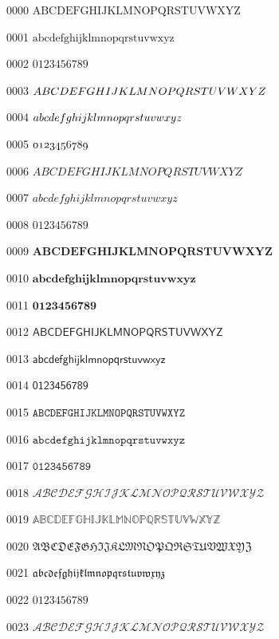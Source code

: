 \documentclass{article}
\begin{document}
0000 $\mathrm{ABCDEFGHIJKLMNOPQRSTUVWXYZ}$\par
0001 $\mathrm{abcdefghijklmnopqrstuvwxyz}$\par
0002 $\mathrm{0123456789}$\par
0003 $\mathnormal{ABCDEFGHIJKLMNOPQRSTUVWXYZ}$\par
0004 $\mathnormal{abcdefghijklmnopqrstuvwxyz}$\par
0005 $\mathnormal{0123456789}$\par
0006 $\mathit{ABCDEFGHIJKLMNOPQRSTUVWXYZ}$\par
0007 $\mathit{abcdefghijklmnopqrstuvwxyz}$\par
0008 $\mathit{0123456789}$\par
0009 $\mathbf{ABCDEFGHIJKLMNOPQRSTUVWXYZ}$\par
0010 $\mathbf{abcdefghijklmnopqrstuvwxyz}$\par
0011 $\mathbf{0123456789}$\par
0012 $\mathsf{ABCDEFGHIJKLMNOPQRSTUVWXYZ}$\par
0013 $\mathsf{abcdefghijklmnopqrstuvwxyz}$\par
0014 $\mathsf{0123456789}$\par
0015 $\mathtt{ABCDEFGHIJKLMNOPQRSTUVWXYZ}$\par
0016 $\mathtt{abcdefghijklmnopqrstuvwxyz}$\par
0017 $\mathtt{0123456789}$\par
0018 $\mathcal{ABCDEFGHIJKLMNOPQRSTUVWXYZ}$\par
0019 $\mathbb{ABCDEFGHIJKLMNOPQRSTUVWXYZ}$\par
0020 $\mathfrak{ABCDEFGHIJKLMNOPQRSTUVWXYZ}$\par
0021 $\mathfrak{abcdefghijklmnopqrstuvwxyz}$\par
0022 $\mathfrak{0123456789}$\par
0023 $\mathscr{ABCDEFGHIJKLMNOPQRSTUVWXYZ}$\par
\end{document}
